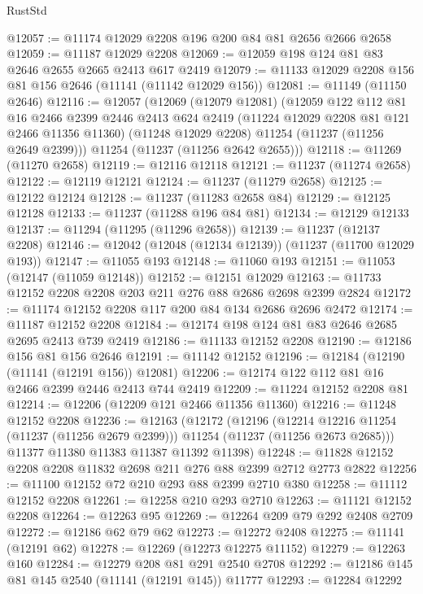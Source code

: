 \begin{lexlean}{RustStd}
\begin{coremodule}
@12057 := @11174 @12029 @2208 @196 @200 @84 @81 @2656 @2666 @2658
@12059 := @11187 @12029 @2208
@12069 := @12059 @198 @124 @81 @83 @2646 @2655 @2665 @2413 @617 @2419
@12079 := @11133 @12029 @2208 @156 @81 @156 @2646 (@11141 (@11142 @12029 @156))
@12081 := @11149 (@11150 @2646)
@12116 := @12057
    (@12069
      (@12079 @12081)
      (@12059
        @122
        @112
        @81
        @16
        @2466
        @2399
        @2446
        @2413
        @624
        @2419
        (@11224 @12029 @2208 @81 @121 @2466 @11356 @11360)
        (@11248 @12029 @2208)
        @11254
        (@11237 (@11256 @2649 @2399)))
      @11254
      (@11237 (@11256 @2642 @2655)))
@12118 := @11269 (@11270 @2658)
@12119 := @12116 @12118
@12121 := @11237 (@11274 @2658)
@12122 := @12119 @12121
@12124 := @11237 (@11279 @2658)
@12125 := @12122 @12124
@12128 := @11237 (@11283 @2658 @84)
@12129 := @12125 @12128
@12133 := @11237 (@11288 @196 @84 @81)
@12134 := @12129 @12133
@12137 := @11294 (@11295 (@11296 @2658))
@12139 := @11237 (@12137 @2208)
@12146 := @12042 (@12048 (@12134 @12139)) (@11237 (@11700 @12029 @193))
@12147 := @11055 @193
@12148 := @11060 @193
@12151 := @11053 (@12147 (@11059 @12148))
@12152 := @12151 @12029
@12163 := @11733 @12152 @2208 @2208 @203 @211 @276 @88 @2686 @2698 @2399 @2824
@12172 := @11174 @12152 @2208 @117 @200 @84 @134 @2686 @2696 @2472
@12174 := @11187 @12152 @2208
@12184 := @12174 @198 @124 @81 @83 @2646 @2685 @2695 @2413 @739 @2419
@12186 := @11133 @12152 @2208
@12190 := @12186 @156 @81 @156 @2646
@12191 := @11142 @12152
@12196 := @12184 (@12190 (@11141 (@12191 @156)) @12081)
@12206 := @12174 @122 @112 @81 @16 @2466 @2399 @2446 @2413 @744 @2419
@12209 := @11224 @12152 @2208 @81
@12214 := @12206 (@12209 @121 @2466 @11356 @11360)
@12216 := @11248 @12152 @2208
@12236 := @12163
    (@12172
      (@12196
        (@12214 @12216 @11254 (@11237 (@11256 @2679 @2399)))
        @11254
        (@11237 (@11256 @2673 @2685)))
      @11377
      @11380
      @11383
      @11387
      @11392
      @11398)
@12248 := @11828 @12152 @2208 @2208 @11832 @2698 @211 @276 @88 @2399 @2712 @2773 @2822
@12256 := @11100 @12152 @72 @210 @293 @88 @2399 @2710 @380
@12258 := @11112 @12152 @2208
@12261 := @12258 @210 @293 @2710
@12263 := @11121 @12152 @2208
@12264 := @12263 @95
@12269 := @12264 @209 @79 @292 @2408 @2709
@12272 := @12186 @62 @79 @62
@12273 := @12272 @2408
@12275 := @11141 (@12191 @62)
@12278 := @12269 (@12273 @12275 @11152)
@12279 := @12263 @160
@12284 := @12279 @208 @81 @291 @2540 @2708
@12292 := @12186 @145 @81 @145 @2540 (@11141 (@12191 @145)) @11777
@12293 := @12284 @12292

\end{coremodule}
\end{lexlean}
